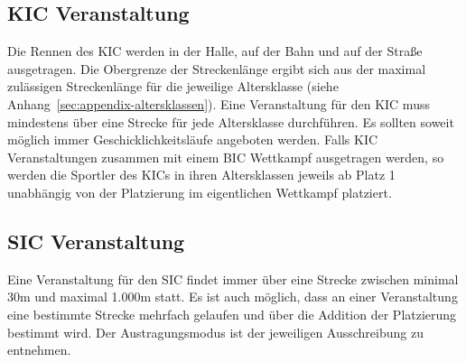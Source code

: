 \subsection{KIC Veranstaltung}
Die Rennen des KIC werden in der Halle, auf der Bahn und auf der Straße ausgetragen. Die Obergrenze der Streckenlänge ergibt sich aus der maximal zulässigen Streckenlänge für die jeweilige Altersklasse (siehe Anhang~\ref{sec:appendix-altersklassen}). Eine Veranstaltung für den KIC muss mindestens über eine Strecke für jede Altersklasse durchführen. Es sollten soweit möglich immer Geschicklichkeitsläufe angeboten werden. Falls KIC Veranstaltungen zusammen mit einem BIC Wettkampf ausgetragen werden, so werden die Sportler des KICs in ihren Altersklassen jeweils ab Platz 1 unabhängig von der Platzierung im eigentlichen Wettkampf platziert.

\subsection{SIC Veranstaltung}
Eine Veranstaltung für den SIC findet immer über eine Strecke zwischen minimal 30m und maximal 1.000m statt. Es ist auch möglich, dass an einer Veranstaltung eine bestimmte Strecke mehrfach gelaufen und über die Addition der Platzierung bestimmt wird. Der Austragungsmodus ist der jeweiligen Ausschreibung zu entnehmen.
